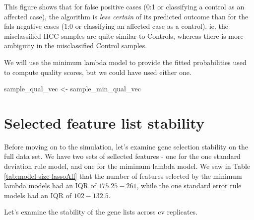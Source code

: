 \documentclass[
]{book}
\newenvironment{Shaded}{\begin{snugshade}}{\end{snugshade}}
\newcommand{\NormalTok}[1]{#1}
\newcommand{\StringTok}[1]{\textcolor[rgb]{0.31,0.60,0.02}{#1}}
\begin{document}
This figure shows that for false positive cases (0:1 or classifying a
control as an affected case), the algorithm is \emph{less certain} of its predicted
outcome than for the fals negative cases (1:0 or classifying an affected case as a control).
ie. the misclassified HCC samples are quite similar to Controls, whereas there
is more ambiguity in the misclassified Control samples.

We will use the minimum lambda model to provide
the fitted probabilities used to compute quality scores,
but we could have used either one.

\begin{Shaded}
\begin{Highlighting}[]
\NormalTok{sample\_qual\_vec <{-}}\StringTok{ }\NormalTok{sample\_min\_qual\_vec}
\end{Highlighting}
\end{Shaded}

\hypertarget{selected-feature-list-stability}{%
\section{Selected feature list stability}\label{selected-feature-list-stability}}

Before moving on to the simulation, let's examine gene selection stability on the
full data set. We have two sets of sellected features - one for the
one standard deviation rule model, and one for the mimimum lambda model.
We saw in Table \ref{tab:model-size-lassoAll} that the number of features
selected by the minimum lambda models had an IQR of
\(175.25-261\),
while the one standard error rule models had an IQR of
\(102-132.5\).

Let's examine the stability of the gene lists across cv replicates.
\end{document}
